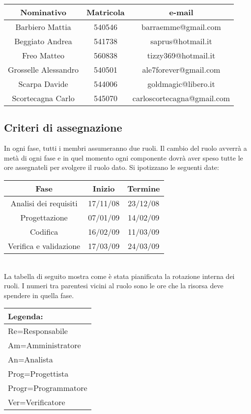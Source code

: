 \documentclass[11pt,a4paper]{article}
\begin{document}
\begin{tabular}{|c|c|c|}
\hline
Nominativo  & Matricola & e-mail \\ \hline
Barbiero Mattia & 540546 & barraemme@gmail.com \\ \hline
Beggiato Andrea & 541738 & saprus@hotmail.it \\ \hline
Freo Matteo & 560838 & tizzy369@hotmail.it \\ \hline
Grosselle Alessandro & 540501 & ale7forever@gmail.com \\ \hline
Scarpa Davide & 544006 & goldmagic@libero.it \\ \hline
Scortecagna Carlo & 545070 & carloscortecagna@gmail.com \\ \hline
\end{tabular}

\subsection{Criteri di assegnazione}
In ogni fase, tutti i membri assumeranno due ruoli.
Il cambio del ruolo avverrà a metà di ogni fase e in quel momento ogni componente dovrà aver speso tutte le ore assegnateli per svolgere il ruolo dato.
Si ipotizzano le seguenti date:\\

\begin{tabular}{|c|c|c|}
\hline
Fase & Inizio  & Termine \\ \hline
Analisi dei requisiti & 17/11/08 & 23/12/08 \\ \hline
Progettazione & 07/01/09 & 14/02/09 \\ \hline
Codifica & 16/02/09 & 11/03/09 \\ \hline
Verifica e validazione & 17/03/09 & 24/03/09 \\ \hline
\end{tabular}
\\

La tabella di seguito mostra come è stata pianificata la rotazione interna dei ruoli.
I numeri tra parentesi vicini al ruolo sono le ore che la risorsa deve spendere in quella fase.

\begin{tabular}{|l|}
\hline
Legenda: \\ \hline
Re=Responsabile \\ \hline
Am=Amministratore \\ \hline
An=Analista \\ \hline
Prog=Progettista \\ \hline
Progr=Programmatore \\ \hline
Ver=Verificatore \\ \hline
\end{tabular}\\\\
\end{document}
